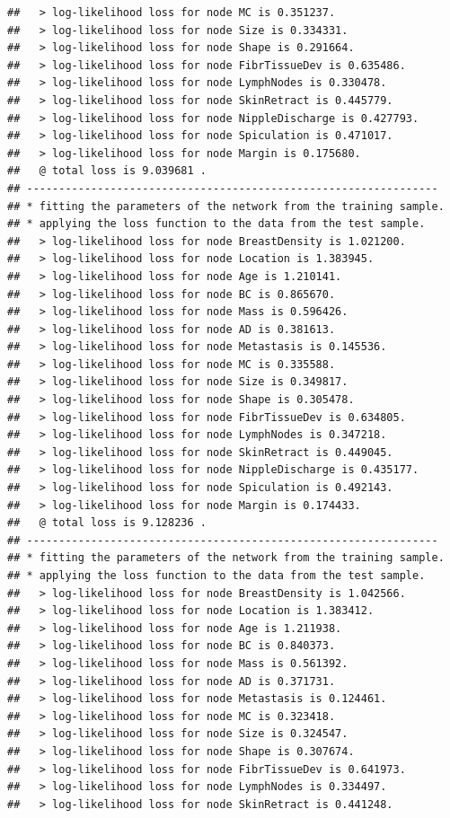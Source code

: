 \documentclass[]{article}
\begin{document}
\begin{verbatim}
##   > log-likelihood loss for node MC is 0.351237.
##   > log-likelihood loss for node Size is 0.334331.
##   > log-likelihood loss for node Shape is 0.291664.
##   > log-likelihood loss for node FibrTissueDev is 0.635486.
##   > log-likelihood loss for node LymphNodes is 0.330478.
##   > log-likelihood loss for node SkinRetract is 0.445779.
##   > log-likelihood loss for node NippleDischarge is 0.427793.
##   > log-likelihood loss for node Spiculation is 0.471017.
##   > log-likelihood loss for node Margin is 0.175680.
##   @ total loss is 9.039681 .
## ----------------------------------------------------------------
## * fitting the parameters of the network from the training sample.
## * applying the loss function to the data from the test sample.
##   > log-likelihood loss for node BreastDensity is 1.021200.
##   > log-likelihood loss for node Location is 1.383945.
##   > log-likelihood loss for node Age is 1.210141.
##   > log-likelihood loss for node BC is 0.865670.
##   > log-likelihood loss for node Mass is 0.596426.
##   > log-likelihood loss for node AD is 0.381613.
##   > log-likelihood loss for node Metastasis is 0.145536.
##   > log-likelihood loss for node MC is 0.335588.
##   > log-likelihood loss for node Size is 0.349817.
##   > log-likelihood loss for node Shape is 0.305478.
##   > log-likelihood loss for node FibrTissueDev is 0.634805.
##   > log-likelihood loss for node LymphNodes is 0.347218.
##   > log-likelihood loss for node SkinRetract is 0.449045.
##   > log-likelihood loss for node NippleDischarge is 0.435177.
##   > log-likelihood loss for node Spiculation is 0.492143.
##   > log-likelihood loss for node Margin is 0.174433.
##   @ total loss is 9.128236 .
## ----------------------------------------------------------------
## * fitting the parameters of the network from the training sample.
## * applying the loss function to the data from the test sample.
##   > log-likelihood loss for node BreastDensity is 1.042566.
##   > log-likelihood loss for node Location is 1.383412.
##   > log-likelihood loss for node Age is 1.211938.
##   > log-likelihood loss for node BC is 0.840373.
##   > log-likelihood loss for node Mass is 0.561392.
##   > log-likelihood loss for node AD is 0.371731.
##   > log-likelihood loss for node Metastasis is 0.124461.
##   > log-likelihood loss for node MC is 0.323418.
##   > log-likelihood loss for node Size is 0.324547.
##   > log-likelihood loss for node Shape is 0.307674.
##   > log-likelihood loss for node FibrTissueDev is 0.641973.
##   > log-likelihood loss for node LymphNodes is 0.334497.
##   > log-likelihood loss for node SkinRetract is 0.441248.

\end{verbatim}
\end{document}
